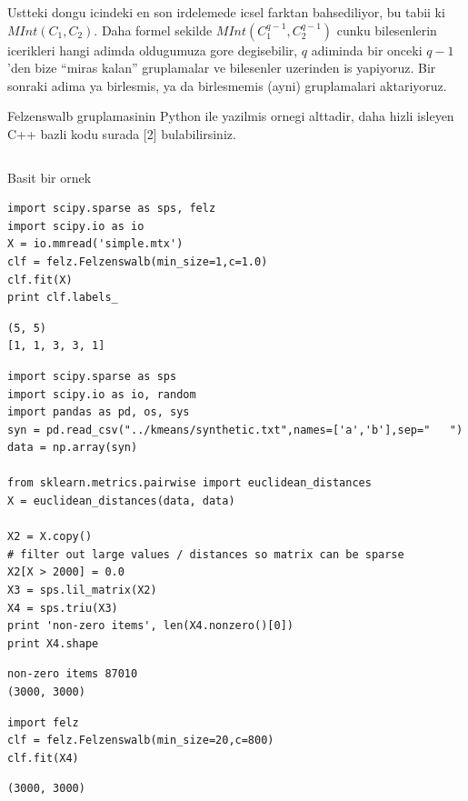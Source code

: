 \documentclass[12pt,fleqn]{article}\usepackage{../common}
\begin{document}
Ustteki dongu icindeki en son irdelemede icsel farktan bahsediliyor, bu
tabii ki $MInt(C_1,C_2)$. Daha formel sekilde $MInt(C_1^{q-1},C_2^{q-1})$
cunku bilesenlerin icerikleri hangi adimda oldugumuza gore degisebilir, $q$
adiminda bir onceki $q-1$'den bize ``miras kalan'' gruplamalar ve
bilesenler uzerinden is yapiyoruz. Bir sonraki adima ya birlesmis, ya da
birlesmemis (ayni) gruplamalari aktariyoruz. 

Felzenswalb gruplamasinin Python ile yazilmis ornegi alttadir, daha hizli
isleyen C++ bazli kodu surada [2] bulabilirsiniz.

\inputminted[fontsize=\footnotesize]{python}{felz.py}

Basit bir ornek

\begin{verbatim}
import scipy.sparse as sps, felz
import scipy.io as io
X = io.mmread('simple.mtx')
clf = felz.Felzenswalb(min_size=1,c=1.0)
clf.fit(X)
print clf.labels_    
\end{verbatim}

\begin{verbatim}
(5, 5)
[1, 1, 3, 3, 1]
\end{verbatim}

\begin{verbatim}
import scipy.sparse as sps
import scipy.io as io, random
import pandas as pd, os, sys
syn = pd.read_csv("../kmeans/synthetic.txt",names=['a','b'],sep="   ")
data = np.array(syn)

from sklearn.metrics.pairwise import euclidean_distances
X = euclidean_distances(data, data)

X2 = X.copy()
# filter out large values / distances so matrix can be sparse
X2[X > 2000] = 0.0
X3 = sps.lil_matrix(X2)
X4 = sps.triu(X3)
print 'non-zero items', len(X4.nonzero()[0])
print X4.shape
\end{verbatim}

\begin{verbatim}
non-zero items 87010
(3000, 3000)
\end{verbatim}

\begin{verbatim}
import felz
clf = felz.Felzenswalb(min_size=20,c=800)
clf.fit(X4)
\end{verbatim}

\begin{verbatim}
(3000, 3000)
\end{verbatim}
\end{document}
